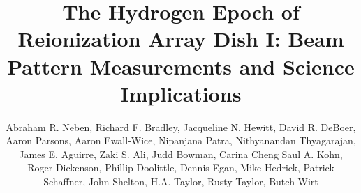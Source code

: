 \documentclass{emulateapj}
\begin{document}
\title{The Hydrogen Epoch of Reionization Array Dish I: Beam Pattern Measurements and Science Implications}


\author{Abraham R. Neben,
Richard F. Bradley,
Jacqueline N. Hewitt,
David R. DeBoer,
Aaron Parsons,
Aaron Ewall-Wice,
Nipanjana Patra,
Nithyanandan Thyagarajan,
James E. Aguirre,
Zaki S. Ali,
Judd Bowman,
Carina Cheng
Saul A. Kohn,
Roger Dickenson,
Phillip Doolittle,
Dennis Egan,
Mike Hedrick,
Patrick Schaffner,
John Shelton,
H.A. Taylor,
Rusty Taylor,
Butch Wirt}



\end{document}

